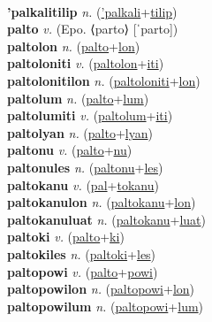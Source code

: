  \label{'palkalitec} \\
\textbf{'palkalitilip} \textit{n.} (\hyperref['palkali]{'palkali}+\hyperref[tilip]{tilip})
 \label{'palkalitilip} \\
\textbf{palto} \textit{v.} (Epo. ⟨parto⟩ [ˈparto])
 \label{palto} \\
\textbf{paltolon} \textit{n.} (\hyperref[palto]{palto}+\hyperref[lon]{lon})
 \label{paltolon} \\
\textbf{paltoloniti} \textit{v.} (\hyperref[paltolon]{paltolon}+\hyperref[iti]{iti})
 \label{paltoloniti} \\
\textbf{paltolonitilon} \textit{n.} (\hyperref[paltoloniti]{paltoloniti}+\hyperref[lon]{lon})
 \label{paltolonitilon} \\
\textbf{paltolum} \textit{n.} (\hyperref[palto]{palto}+\hyperref[lum]{lum})
 \label{paltolum} \\
\textbf{paltolumiti} \textit{v.} (\hyperref[paltolum]{paltolum}+\hyperref[iti]{iti})
 \label{paltolumiti} \\
\textbf{paltolyan} \textit{n.} (\hyperref[palto]{palto}+\hyperref[lyan]{lyan})
 \label{paltolyan} \\
\textbf{paltonu} \textit{v.} (\hyperref[palto]{palto}+\hyperref[nu]{nu})
 \label{paltonu} \\
\textbf{paltonules} \textit{n.} (\hyperref[paltonu]{paltonu}+\hyperref[les]{les})
 \label{paltonules} \\
\textbf{paltokanu} \textit{v.} (\hyperref[pal]{pal}+\hyperref[tokanu]{tokanu})
 \label{paltokanu} \\
\textbf{paltokanulon} \textit{n.} (\hyperref[paltokanu]{paltokanu}+\hyperref[lon]{lon})
 \label{paltokanulon} \\
\textbf{paltokanuluat} \textit{n.} (\hyperref[paltokanu]{paltokanu}+\hyperref[luat]{luat})
 \label{paltokanuluat} \\
\textbf{paltoki} \textit{v.} (\hyperref[palto]{palto}+\hyperref[ki]{ki})
 \label{paltoki} \\
\textbf{paltokiles} \textit{n.} (\hyperref[paltoki]{paltoki}+\hyperref[les]{les})
 \label{paltokiles} \\
\textbf{paltopowi} \textit{v.} (\hyperref[palto]{palto}+\hyperref[powi]{powi})
 \label{paltopowi} \\
\textbf{paltopowilon} \textit{n.} (\hyperref[paltopowi]{paltopowi}+\hyperref[lon]{lon})
 \label{paltopowilon} \\
\textbf{paltopowilum} \textit{n.} (\hyperref[paltopowi]{paltopowi}+\hyperref[lum]{lum})
 \label{paltopowilum} \\

